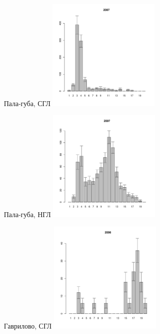 \begin{figure}[hp]
\begin{minipage}[b]{.46\linewidth}
\begin{center}
	{\footnotesize Пала-губа, СГЛ}
	\includegraphics[width=55mm]{../Barenc_Sea/Pala/middle_2007_.pdf}
	\end{center}
	\end{minipage}
	\hfil %
	\begin{minipage}[b]{.46\linewidth}
	\begin{center}	
	{\footnotesize Пала-губа, НГЛ}
	\includegraphics[width=55mm]{../Barenc_Sea/Pala/low_2007_.pdf}
	\end{center}
	\end{minipage}
	\begin{minipage}[b]{.46\linewidth}
	\begin{center}
	{\footnotesize Гаврилово, СГЛ}
	\includegraphics[width=55mm]{../Barenc_Sea/Gavrilovo/middle_2008_.pdf}
	\end{center}
	\end{minipage}

\end{figure}
